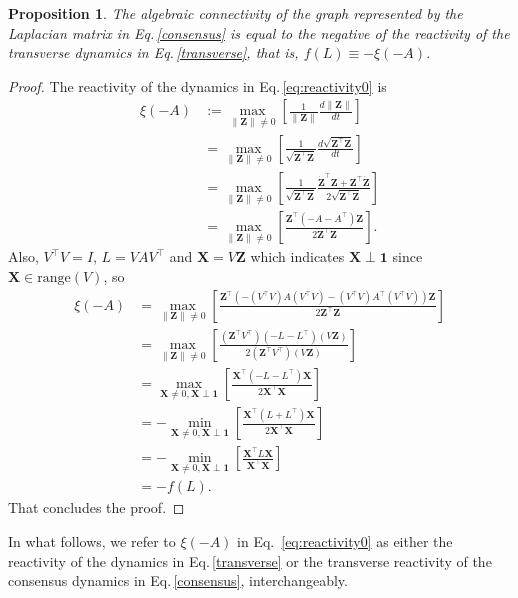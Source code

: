 \documentclass[%
 reprint,
 amsmath,amssymb,
 aip,
]{revtex4-2}
\def \bX {\pmb{X}}
\def \bZ {\pmb{Z}}
\def \bone {\pmb{1}}
\theoremstyle{italichead}
\newtheorem{proposition}[theorem]{Proposition}
\theoremstyle{definition}
\begin{document}
{\begin{proposition}
    The algebraic connectivity of the graph represented by the Laplacian matrix in Eq.\,\eqref{consensus} is equal to the negative of the reactivity of the transverse dynamics in Eq.\,\eqref{transverse}, that is, $f(L) \equiv - \xi(-A)$.
\end{proposition}
\begin{proof}
    The reactivity of the dynamics in Eq.\,\eqref{eq:reactivity0} is
    \begin{align*}
        \xi\left( -A \right) & :=  \max_{\|  \bZ\| \neq 0} \left[ \frac{1}{\|  \bZ \|} \frac{d \|  \bZ\|}{d t} \right] \\
        & = \max_{\|  \bZ\| \neq 0} \left[ \frac{1}{\sqrt{\bZ^\top \bZ}} \frac{d \sqrt{\bZ^\top \bZ}}{d t} \right] \\
        & = \max_{\|  \bZ\| \neq 0} \left[ \frac{1}{\sqrt{\bZ^\top \bZ}} \frac{\dot{\bZ}^\top \bZ + \bZ^\top \dot{\bZ}}{2\sqrt{\bZ^\top \bZ}} \right] \\
        & = \max_{\|  \bZ\| \neq 0} \left[ \frac{\bZ^\top (-A - A^\top) \bZ}{2 \bZ^\top \bZ} \right].
    \end{align*}
    Also, $V^\top V = I$, $L = V A V^\top$ and $\bX = V \bZ$ which indicates $\bX \perp \bone$ since $\bX \in \text{range}(V)$, so
    {\footnotesize
    \begin{align*}
        \xi\left( -A \right) & = \max_{\|  \bZ\| \neq 0} \left[ \frac{\bZ^\top  \left(-(V^\top V) A (V^\top V) - (V^\top V) A^\top (V^\top V)\right) \bZ}{2 \bZ^\top \bZ} \right] \\
        & = \max_{\|  \bZ\| \neq 0} \left[ \frac{(\bZ^\top V^\top)  (- L - L^\top) (V\bZ)}{2 (\bZ^\top V^\top) (V\bZ)} \right] \\
        & = \max_{ \bX \neq 0, \bX \perp \bone} \left[ \frac{\bX^\top  (- L - L^\top) \bX}{2 \bX^\top \bX} \right] \\
        & = -\min_{ \bX \neq 0, \bX \perp \bone} \left[ \frac{\bX^\top  ( L + L^\top) \bX}{2 \bX^\top \bX} \right] \\
        & = -\min_{ \bX \neq 0, \bX \perp \bone} \left[ \frac{\bX^\top  L \bX}{\bX^\top \bX} \right] \\
        & = -f (L).
    \end{align*}}
    That concludes the proof.
\end{proof}





In what follows, we refer to $\xi(-A)$ in Eq.\ \eqref{eq:reactivity0} as either the reactivity of the dynamics in Eq.\,\eqref{transverse} or the transverse reactivity of the consensus dynamics in Eq.\,\eqref{consensus}, interchangeably.



}
\end{document}

